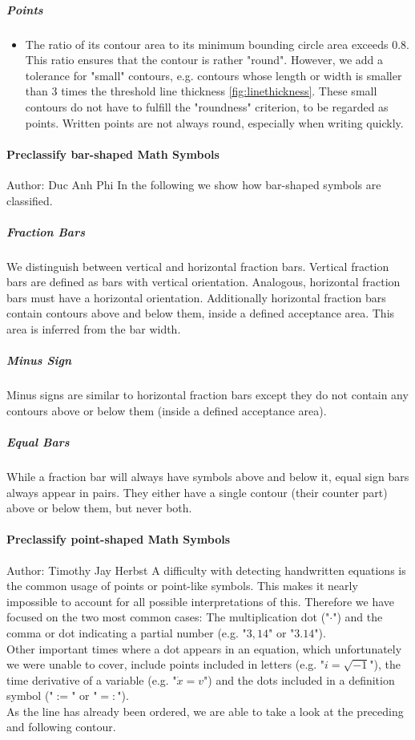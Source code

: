 \documentclass[12pt]{article}
\begin{document}
	\subparagraph{Points}
	\begin{itemize}
		\item The ratio of its contour area to its minimum bounding circle area exceeds 0.8. This ratio ensures that the contour is rather "round". However, we add a tolerance for "small" contours, e.g. contours whose length or width is smaller than 3 times the threshold line thickness \ref{fig:linethickness}. These small contours do not have to fulfill the "roundness" criterion, to be regarded as points. Written points are not always round, especially when writing quickly.
	\end{itemize}

	\paragraph{Preclassify bar-shaped Math Symbols}
	\small{Author: Duc Anh Phi} \newline \newline
	In the following we show how bar-shaped symbols are classified.
	\subparagraph{Fraction Bars}\label{fractionbar}
	We distinguish between vertical and horizontal fraction bars.
	Vertical fraction bars are defined as bars with vertical orientation. Analogous, horizontal fraction bars must have a horizontal orientation. Additionally horizontal fraction bars contain contours above and below them, inside a defined acceptance area. This area is inferred from the bar width.
	
	\subparagraph{Minus Sign}
	Minus signs are similar to horizontal fraction bars except they do not contain any contours above or below them (inside a defined acceptance area).

	\subparagraph{Equal Bars}\label{equalbars}
	While a fraction bar will always have symbols above and below it, equal sign bars always appear in pairs. They either have a single contour (their counter part) above or below them, but never both.
	
	\paragraph{Preclassify point-shaped Math Symbols}
	\small{Author: Timothy Jay Herbst} \newline \newline
	A difficulty with detecting handwritten equations is the common usage of points or point-like symbols.
	This makes it nearly impossible to account for all possible interpretations of this.
	Therefore we have focused on the two most common cases:
	The multiplication dot ("$\cdot$") and the comma or dot indicating a partial number (e.g. "$3,14$" or "$3.14$").\\
	Other important times where a dot appears in an equation, which unfortunately we were unable to cover, include points included in letters (e.g. "$i=\sqrt{-1}$"), the time derivative of a variable (e.g. "$\dot{x}=v$") and the dots included in a definition symbol ("$:=$" or "$=:$").\\  %
	As the line has already been ordered, we are able to take a look at the preceding and following contour.
	
\end{document}
